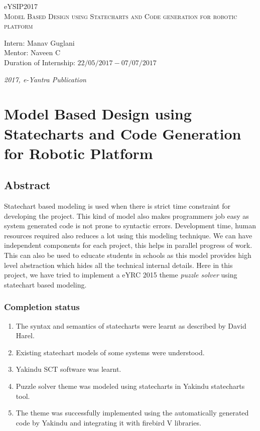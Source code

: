 \documentclass[a4paper,12pt,oneside]{book}
\begin{document}
\begin{titlepage}
\raggedright
{\Large eYSIP2017\\[1cm]}
{\Huge\scshape Model Based Design using Statecharts and Code generation for robotic platform \\[.1in]}
\vfill
\begin{flushright}
{\large Intern: Manav Guglani \\}
{\large Mentor: Naveen C \\}
{\large Duration of Internship: $ 22/05/2017-07/07/2017 $ \\}
\end{flushright}

{\itshape 2017, e-Yantra Publication}
\end{titlepage}

\chapter[Project Tag]{ Model Based Design using Statecharts and Code Generation for Robotic Platform}
\section*{Abstract}
Statechart based modeling is used when there is strict time constraint for developing the project. This kind of model also makes programmers job easy as system generated code is not prone to syntactic errors. Development time, human
resources required also reduces a lot using this modeling technique. We can have
independent components for each project, this helps in parallel progress of work.
This can also be used to educate students in schools as this model provides high
level abstraction which hides all the technical internal details. Here in this project, we have tried to implement a eYRC 2015 theme \emph{puzzle solver} using statechart based modeling.
\subsection*{Completion status}
\begin{enumerate}
\item The syntax and semantics of statecharts were learnt as described by David Harel. 
\item Existing statechart models of some systems were understood. 
\item Yakindu SCT software was learnt. 
\item Puzzle solver theme was modeled using statecharts in Yakindu statecharts tool.
\item The theme was successfully implemented using the automatically generated code by Yakindu and integrating it with firebird V libraries. 
\end{enumerate}
\end{document}
